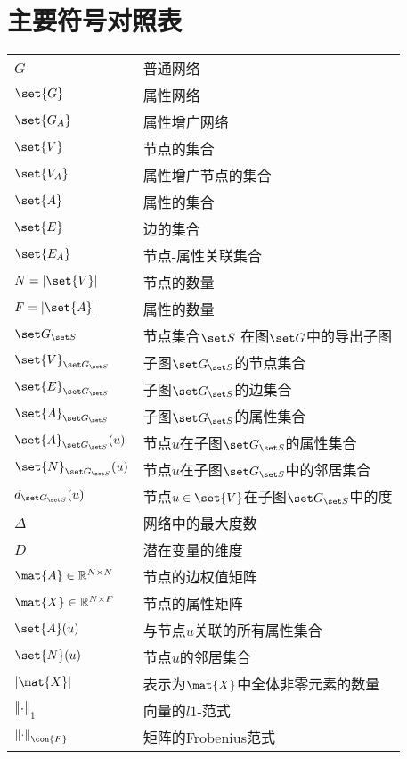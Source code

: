 \chapter*{\heiti 主要符号对照表}

\begin{table}[htb]
	\label{notations}
	\begin{tabular}{@{~}ll}
		${G}$ & 普通网络\\
		$\set{G}$ & 属性网络\\
		$\set{G_A}$ & 属性增广网络\\
		$\set{V}$ &  节点的集合\\
		$\set{V_A}$ &  属性增广节点的集合\\
		$\set{A}$ &  属性的集合\\
		$\set{E}$ &  边的集合\\
		$\set{E_A}$ &  节点-属性关联集合\\
		$N=|\set{V}|$ &  节点的数量\\
		$F=|\set{A}|$ &  属性的数量\\
		$\set G_{\set S}$ & 节点集合$\set S$ 在图$\set G$中的导出子图\\
		$\set{V}_{\set G_{\set S}}$ & 子图$\set G_{\set S}$的节点集合\\
		$\set{E}_{\set G_{\set S}}$ & 子图$\set G_{\set S}$的边集合\\
		$\set{A}_{\set G_{\set S}}$ & 子图$\set G_{\set S}$的属性集合\\
		$\set{A}_{\set G_{\set S}}(u)$ &  节点$u$在子图$\set G_{\set S}$的属性集合\\
		$\set{N}_{\set G_{\set S}}(u)$ & 节点$u$在子图$\set G_{\set S}$中的邻居集合\\
		$d_{\set G_{\set S}}(u)$ & 节点$u\in \set{V}$在子图${\set G_{\set S}}$中的度\\
		$\Delta$ & 网络中的最大度数\\
		$D$ &  潜在变量的维度\\
		$\mat{A}\in \mathbb{R}^{N \times N}$ &  节点的边权值矩阵\\
		$\mat{X}\in \mathbb{R}^{N \times F}$ &  节点的属性矩阵 \\
		$\set{A}(u)$ & 与节点$u$关联的所有属性集合\\
		$\set{N}(u)$ & 节点$u$的邻居集合\\
		$|\mat{X}|$ & 表示为$\mat{X}$中全体非零元素的数量\\
		$\left\Vert \cdot\right\Vert _{1}$ & 向量的$l1$-范式\\
		$\left\Vert \cdot\right\Vert _\con{F}$ & 矩阵的Frobenius范式\\
	\end{tabular}
\end{table}



